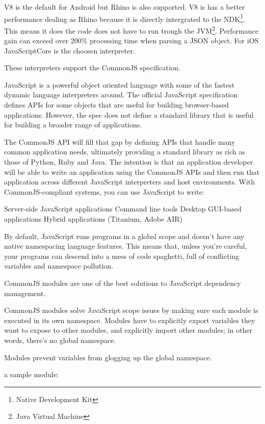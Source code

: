V8 is the default for Android but Rhino is also supported. V8 is has a better performance dealing as Rhino because it is directly intergrated to the NDK\footnote{Native Development Kit}. This means it does the code does not have to run trough the JVM\footnote{Java Virtual Machine}. Performance gain can exceed over 200\% processing time when parsing a JSON object.\cite{Lukasavage2011}
For iOS JavaScriptCore is the choosen interpreter.

These interpreters support the CommonJS specification.


JavaScript is a powerful object oriented language with some of the fastest dynamic language interpreters around. The official JavaScript specification defines APIs for some objects that are useful for building browser-based applications. However, the spec does not define a standard library that is useful for building a broader range of applications.

The CommonJS API will fill that gap by defining APIs that handle many common application needs, ultimately providing a standard library as rich as those of Python, Ruby and Java. The intention is that an application developer will be able to write an application using the CommonJS APIs and then run that application across different JavaScript interpreters and host environments. With CommonJS-compliant systems, you can use JavaScript to write:

Server-side JavaScript applications
Command line tools
Desktop GUI-based applications
Hybrid applications (Titanium, Adobe AIR)



By default, JavaScript runs programs in a global scope and doesn't have any native namespacing language features. This means that, unless you're careful, your programs can descend into a mess of code spaghetti, full of conflicting variables and namespace pollution.

CommonJS modules are one of the best solutions to JavaScript dependency management.

CommonJS modules solve JavaScript scope issues by making sure each module is executed in its own namespace. Modules have to explicitly export variables they want to expose to other modules, and explicitly import other modules; in other words, there's no global namespace.

Modules prevent variables from glogging up the global namespace.


a sample module:


